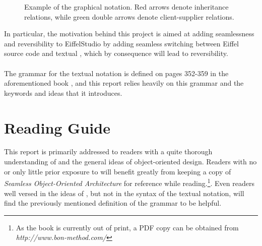 \begin{figure}[H]
    \centerline{}
    \caption[Example of the graphical \bon{} notation]{Example of the graphical \bon{} notation. Red arrows denote inheritance relations, while green double arrows denote client-supplier relations.}
    \label{fig:context-classes}
\end{figure}

In particular, the motivation behind this project is aimed at adding seamlessness and reversibility to EiffelStudio by adding seamless switching between Eiffel source code and textual \bon{}, which by consequence will lead to reversibility.

\paragraph{}
The grammar for the textual \bon{} notation is defined on pages 352-359 in the aforementioned book \cite{walden1995}, and this report relies heavily on this grammar and the keywords and ideas that it introduces.

\section{Reading Guide}
This report is primarily addressed to readers with a quite thorough understanding of \bon{} and the general ideas of object-oriented design. Readers with no or only little prior exposure to \bon{} will benefit greatly from keeping a copy of \textit{Seamless Object-Oriented Architecture} for reference while reading.\footnote{As the book is currently out of print, a PDF copy can be obtained from \textit{http://www.bon-method.com/}}. Even readers well versed in the ideas of \bon{}, but not in the syntax of the textual notation, will find the previously mentioned definition of the grammar to be helpful.

